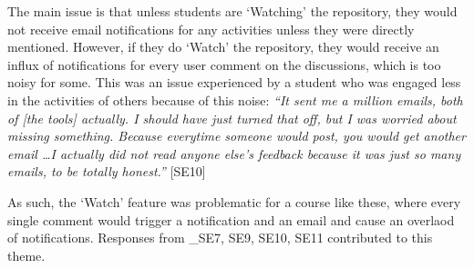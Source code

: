 The main issue is that unless students are `Watching' the repository, they would not receive email notifications for any activities unless they were directly mentioned. However, if they do `Watch' the repository, they would receive an influx of notifications for every user comment on the discussions, which is too noisy for some. This was an issue experienced by a student who was engaged less in the activities of others because of this noise: \textit{``It sent me a million emails, both of [the tools] actually. I should have just turned that off, but I was worried about missing something. Because everytime someone would post, you would get another email \ldots I actually did not read anyone else's feedback because it was just so many emails, to be totally honest.''} [SE10]

As such, the `Watch' feature was problematic for a course like these, where every single comment would trigger a notification and an email and cause an overlaod of notifications. Responses from _{SE7, SE9, SE10, SE11} contributed to this theme.







